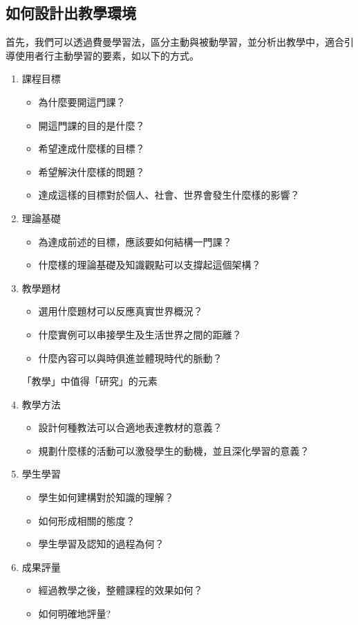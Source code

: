 \subsection{如何設計出教學環境}
\par
\renewcommand{\baselinestretch}{1} %
\fontsize{12pt}\baselineskip\selectfont\qquad 首先，我們可以透過費曼學習法，區分主動與被動學習，並分析出教學中，適合引導使用者行主動學習的要素，如以下的方式。
\begin{enumerate}
	\item 課程目標
	\begin{itemize}
		\item 為什麼要開這門課？
		\item 開這門課的目的是什麼？
		\item 希望達成什麼樣的目標？
		\item 希望解決什麼樣的問題？
		\item 達成這樣的目標對於個人、社會、世界會發生什麼樣的影響？
	\end{itemize}
	\item 理論基礎
	\begin{itemize}
		\item 為達成前述的目標，應該要如何結構一門課？
		\item 什麼樣的理論基礎及知識觀點可以支撐起這個架構？
	\end{itemize}
	\item 教學題材
	\begin{itemize}
		\item 選用什麼題材可以反應真實世界概況？
		\item 什麼實例可以串接學生及生活世界之間的距離？
		\item 什麼內容可以與時俱進並體現時代的脈動？
	\end{itemize}
「教學」中值得「研究」的元素
	\item 教學方法
	\begin{itemize}
		\item 設計何種教法可以合適地表達教材的意義？
		\item 規劃什麼樣的活動可以激發學生的動機，並且深化學習的意義？
	\end{itemize}
	\item 學生學習
	\begin{itemize}
		\item 學生如何建構對於知識的理解？
		\item 如何形成相關的態度？
		\item 學生學習及認知的過程為何？
	\end{itemize}
	\item 成果評量
	\begin{itemize}
		\item 經過教學之後，整體課程的效果如何？
		\item 如何明確地評量?
	\end{itemize}
\end{enumerate}
\par


